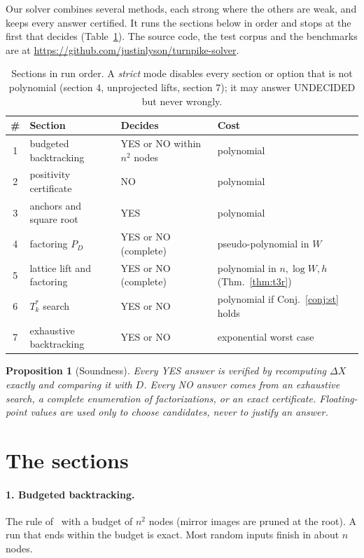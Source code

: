 \documentclass[11pt]{article}
\newtheorem{proposition}[lemma]{Proposition}
\theoremstyle{definition}
\newcommand{\repourl}{\url{https://github.com/justinlyson/turnpike-solver}}
\begin{document}
Our solver combines several methods, each strong where the others are weak, and keeps every answer certified. It runs
the sections below in order and stops at the first that decides (Table~\ref{tab:sections}). The source code, the test
corpus and the benchmarks are at \repourl.

\begin{table}[t]
\centering\small
\begin{tabular}{@{}clll@{}}
\toprule
\# & Section & Decides & Cost \\
\midrule
1 & budgeted backtracking & YES or NO within $n^2$ nodes & polynomial \\
2 & positivity certificate & NO & polynomial \\
3 & anchors and square root & YES & polynomial \\
4 & factoring $P_D$ & YES or NO (complete) & pseudo-polynomial in $W$ \\
5 & lattice lift and factoring & YES or NO (complete) & polynomial in $n,\log W, h$ (Thm.~\ref{thm:t3r}) \\
6 & $T^*_k$ search & YES or NO & polynomial if Conj.~\ref{conj:st} holds \\
7 & exhaustive backtracking & YES or NO & exponential worst case \\
\bottomrule
\end{tabular}
\caption{Sections in run order. A \emph{strict} mode disables every section or option that is not polynomial
(section 4, unprojected lifts, section 7); it may answer UNDECIDED but never wrongly.}
\label{tab:sections}
\end{table}

\begin{proposition}[Soundness]
Every YES answer is verified by recomputing $\Delta X$ exactly and comparing it with $D$. Every NO answer comes from
an exhaustive search, a complete enumeration of factorizations, or an exact certificate. Floating-point values are
used only to choose candidates, never to justify an answer.
\end{proposition}

\section{The sections}

\paragraph{1. Budgeted backtracking.} The rule of~\cite{SSL90} with a budget of $n^2$ nodes (mirror images
are pruned at the root). A run that ends within the budget is exact. Most random inputs finish in about $n$ nodes.
\end{document}
